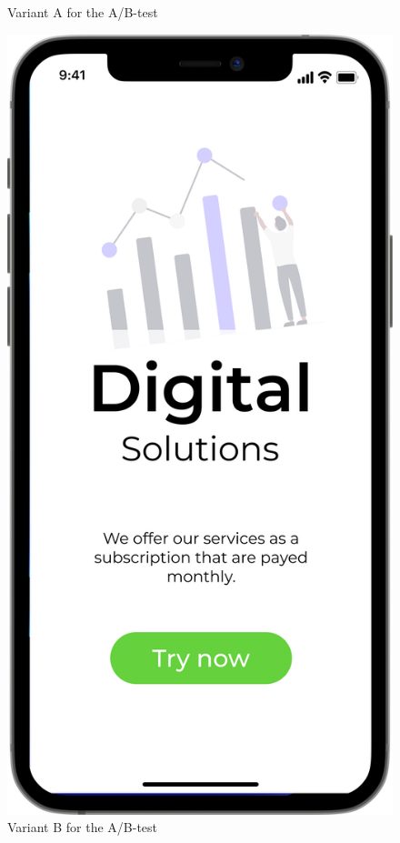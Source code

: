 \begin{figure}[H]
\begin{minipage}[b]{0.45\textwidth}
    \caption{Variant A for the A/B-test}
    \label{fig:images/A}
  \end{minipage}
  \hfill
  \begin{minipage}[b]{0.45\textwidth}
    \includegraphics[width=\linewidth]{images/B.png}
    \caption{Variant B for the A/B-test}
    \label{fig:images/B}
  \end{minipage}
\end{figure}




